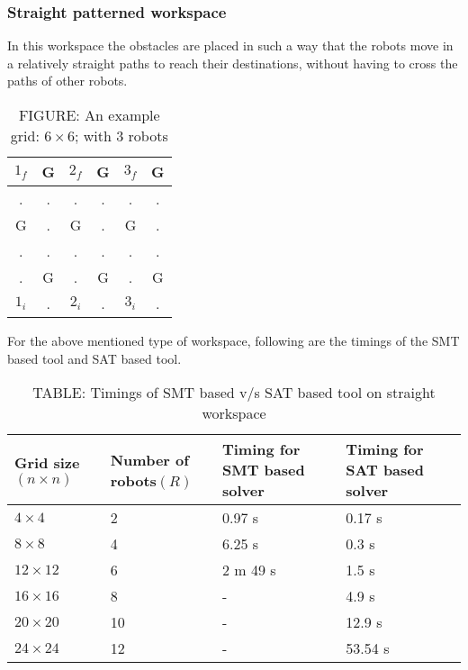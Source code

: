 \documentclass{article}[11pt]
\begin{document}
			\subsubsection{Straight patterned workspace}
			In this workspace the obstacles are placed in such a way that the robots move in a relatively straight paths to reach their destinations, without having to cross the paths of other robots.\\
				\begin{table}[h!]
				\centering
				\begin{tabular}{| c | c | c | c | c | c |} 
				 \hline
				 $1_f$ & G & $2_f$ & G & $3_f$ & G \\ 
				 \hline
				 . & . & . & . & . & . \\
				 \hline
				 G & . & G & . & G & . \\
				 \hline
				 . & . & . & . & . & . \\
				 \hline
				 . & G & . & G & . & G \\
				 \hline
				 $1_i$ & . & $2_i$ & . & $3_i$ & . \\ [1ex] 
				 \hline
				\end{tabular}
				\caption*{FIGURE: An example grid: $6\times 6$; with 3 robots}
				\end{table}




			For the above mentioned type of workspace, following are the timings of the SMT based tool and SAT based tool.
				\begin{table}[h!]
				\centering
				\begin{tabular}{|| p{2cm} | p{2cm} | p{2cm} | p{2cm} ||} 
				 \hline\hline
				 Grid size$(n \times n)$ & Number of robots$(R)$ & Timing for SMT based solver & Timing for SAT based solver \\ [0.5ex] 
				 \hline\hline
				 $4 \times 4$ & 2 & 0.97 s & 0.17 s \\ 
				 $8 \times 8$ & 4 & 6.25 s & 0.3 s \\
				 $12 \times 12$ & 6 & 2 m 49 s & 1.5 s \\
				 $16 \times 16$ & 8 & - & 4.9 s \\
				 $20 \times 20$ & 10 & - & 12.9 s \\
				 $24 \times 24$ & 12 & - & 53.54 s  \\ [1ex]
				 \hline
				\end{tabular}
				\caption*{TABLE: Timings of SMT based v/s SAT based tool on straight workspace}
				\end{table}
\end{document}

